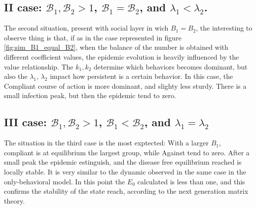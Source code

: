 \subsection{II case: $\mathcal{B}_1, \mathcal{B}_2 >1$, $\mathcal{B}_1 =  \mathcal{B}_2$, and $\lambda_1 < \lambda_2$.}
The second situation, present with social layer in wich $B_1 = B_2$, the interesting to observe thing is that, if as in the case represented in figure \ref{fig:sim_B1_equal_B2}, when the balance of the number is obtained with different coefficient values, the epidemic evolution is heavily influenced by the value relationship. The $k_1, k_2$ determine which behaviors becomes dominant, but also the $\lambda_1$, $\lambda_2$  impact how persistent is a certain behavior. In this case, the Compliant course of action is  more dominant, and slighty less sturdy. There is a small infection peak, but then the epidemic tend to zero.
\subsection{III case: $\mathcal{B}_1, \mathcal{B}_2 >1$, $\mathcal{B}_1 <  \mathcal{B}_2$, and $\lambda_1 = \lambda_2$}
The situation in the third case is the most exptected: With a larger $B_1$, compliant is at equilibrium the largest group, while Against tend to zero. After a small peak the epidemic estinguish, and the disease free equilibrium reached is locally stable. It is very similar to the dynamic observed in the same case in the only-behavioral model. 
In this point the $E_0$ calculated is less than one, and this confirms the stability of the state reach, according to the next generation matrix theory.

